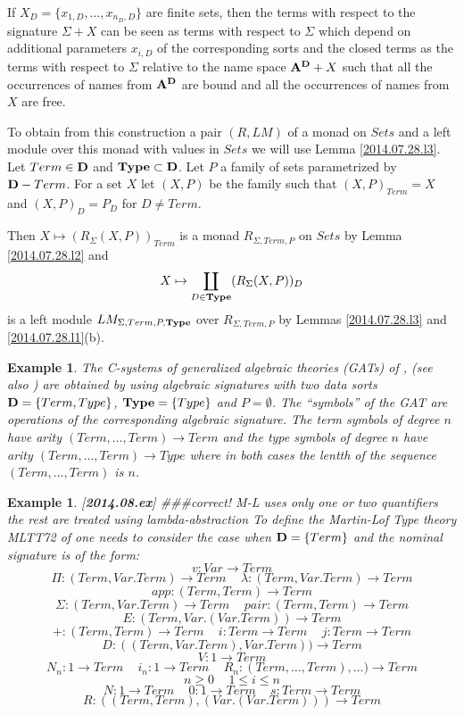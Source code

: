 \documentclass[11pt]{article}
\newtheorem{example}[proposition]{Example}
\newcommand{\llabel}[1]{\label{#1}[{\bf #1}]}
\newcommand{\sr}{\rightarrow}
\newcommand{\spc}{{\,\,\,\,\,\,\,}}
\begin{document}
{If $X_D=\{x_{1,D},\dots,x_{n_D,D}\}$ are finite sets, then the terms with respect to the signature $\Sigma+X$ can be seen as terms with respect to $\Sigma$ which depend on additional parameters $x_{i,D}$ of the corresponding sorts and the closed terms as the terms with respect to $\Sigma$ relative to the name space ${\bf A}^{\bf D}+X$ such that all the occurrences of names from ${\bf A}^{\bf D}$ are bound and all the occurrences of names from $X$ are free. 

To obtain from this construction a pair $(R,LM)$ of a monad on $Sets$ and a left module over this monad with values in $Sets$ we will use Lemma \ref{2014.07.28.l3}. Let $Term\in{\bf D}$ and ${\bf Type}\subset{\bf D}$. Let $P$ a family of sets parametrized by ${\bf D}-{Term}$. For a set $X$ let $(X,P)$ be the family such that $(X,P)_{Term}=X$ and $(X,P)_{D}=P_{D}$ for $D\ne Term$. 

Then $X\mapsto (R_{\Sigma}(X,P))_{Term}$ is a monad $R_{\Sigma,Term,P}$ on $Sets$ by Lemma \ref{2014.07.28.l2} and 
%
$$X\mapsto \coprod_{D\in {\bf Type}} (R_{\Sigma}(X,P))_D$$
%
is a left module $LM_{\Sigma,Term,P,{\bf Type}}$ over $R_{\Sigma,Term,P}$ by Lemmas \ref{2014.07.28.l3} and \ref{2014.07.28.l1}(b). 
%
\begin{example}\rm
The C-systems of generalized algebraic theories (GATs) of \cite{Cartmell0},\cite{Cartmell1} (see also \cite{Garner}) are obtained by using algebraic signatures with two data sorts ${\bf D}=\{Term,Type\}$, ${\bf Type}=\{Type\}$ and $P=\emptyset$. The ``symbols'' of the GAT are operations of the corresponding algebraic signature. The term symbols of degree $n$ have arity $(Term,\dots,Term)\sr Term$ and the type symbols of degree $n$ have arity $(Term,\dots,Term)\sr Type$ where in both cases the lentth of the sequence $(Term,\dots,Term)$ is $n$. 
\end{example}
%
\begin{example}
\llabel{2014.08.ex}\rm
###correct! M-L uses only one or two quantifiers the rest are treated using lambda-abstraction
To define the Martin-Lof Type theory MLTT72 of \cite{ML72}  one needs to consider the case when ${\bf D}=\{Term\}$ and the nominal signature is of the form:
%
$$v:Var\sr Term$$
$$\Pi:(Term, Var.Term)\sr Term\spc\lambda:(Term,Var.Term)\sr Term$$ $$app:(Term,Term)\sr Term$$
$$\Sigma:(Term,Var.Term)\sr Term\spc pair:(Term,Term)\sr Term$$ $$E:(Term,Var.(Var.Term))\sr Term$$
$$+:(Term,Term)\sr Term\spc i:Term\sr Term\spc j:Term\sr Term$$ $$D:((Term,Var.Term),Var.Term))\sr Term$$
$$V:1\sr Term$$
$$N_n:1\sr Term\spc i_n:1\sr Term\spc R_n:(Term,\dots,Term),\dots)\sr Term$$ $$n\ge 0\spc 1\le i \le n$$
$$N:1\sr Term\spc 0:1\sr Term\spc s:Term\sr Term$$ $$R:((Term,Term),(Var.(Var.Term)))\sr Term$$


\end{example}}
\end{document}
